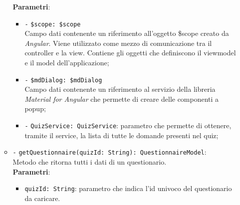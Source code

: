 \begin{itemize}
\begin{itemize}
		\textbf{Parametri}: 
		\begin{itemize}
			\item \texttt{-} \texttt{\$scope: \$scope} \\
			Campo dati contenente un riferimento all’oggetto \$scope creato da \textit{Angular}. Viene utilizzato come mezzo di comunicazione tra il controller e la view. Contiene gli oggetti che definiscono il viewmodel e il model dell’applicazione;
			\item \texttt{-} \texttt{\$mdDialog: \$mdDialog} \\
			Campo dati contenente un riferimento al servizio della libreria \textit{Material for Angular} che permette di creare delle componenti a popup;
			\item \texttt{-} \texttt{QuizService: QuizService}: parametro che permette di ottenere, tramite il service, la lista di tutte le domande presenti nel quiz;
		\end{itemize}
		\item \texttt{-} \texttt{getQuestionnaire(quizId: String): QuestionnaireModel}: \\Metodo che ritorna tutti i dati di un questionario.\\
		\textbf{Parametri}:
		\begin{itemize}
			\item \texttt{quizId: String}: parametro che indica l'id univoco del questionario da caricare.
		\end{itemize}
	\end{itemize}
\end{itemize}

